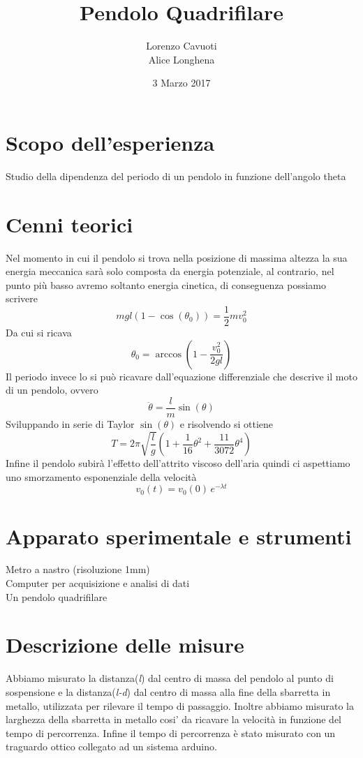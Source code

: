 \documentclass{article}
\title{Pendolo Quadrifilare}
\date{3 Marzo 2017}
\author{Lorenzo Cavuoti\\Alice Longhena}
\begin{document}
	\maketitle
	\section{Scopo dell'esperienza}
		Studio della dipendenza del periodo di un pendolo in funzione dell'angolo theta
	\section{Cenni teorici}
		Nel momento in cui il pendolo si trova nella posizione di massima altezza la sua energia meccanica sar\`{a} solo composta da energia potenziale, al contrario, nel punto pi\`{u} basso avremo soltanto energia cinetica, di conseguenza possiamo scrivere
		\begin{equation}
			mgl(1-\cos(\theta_0)) = \frac{1}{2}mv_0^2
		\end{equation}
		Da cui si ricava
		\begin{equation}
			\theta_0 = \arccos(1-\frac{v_0^2}{2gl})
		\end{equation}
		Il periodo invece lo si pu\`{o} ricavare dall'equazione differenziale che descrive il moto di un pendolo, ovvero
		\begin{equation}
			\ddot{\theta} = \frac{l}{m}\sin(\theta)
		\end{equation}
		Sviluppando in serie di Taylor $\sin(\theta)$ e risolvendo si ottiene
		\begin{equation}
			T = 2\pi \sqrt{\frac{l}{g}}(1+\frac{1}{16}\theta^2+\frac{11}{3072}\theta^4)
			\label{eq periodo}
		\end{equation}
		Infine il pendolo subir\`{a} l'effetto dell'attrito viscoso dell'aria quindi ci aspettiamo uno smorzamento esponenziale della velocit\`{a}
		\begin{equation}
			v_0(t) = v_0(0)\,e^{-\lambda t}
			\label{eq smorzamento}
		\end{equation}
	
	\section{Apparato sperimentale e strumenti}
		Metro a nastro (risoluzione 1mm)\\
		Computer per acquisizione e analisi di dati\\
		Un pendolo quadrifilare
	
	\section{Descrizione delle misure}
		Abbiamo misurato la distanza(\textit{l}) dal centro di massa del pendolo al punto di sospensione e la distanza(\textit{l-d}) dal centro di massa alla fine della sbarretta in metallo, utilizzata per rilevare il tempo di passaggio. Inoltre abbiamo misurato la larghezza della sbarretta in metallo cosi' da ricavare la velocit\`{a} in funzione del tempo di percorrenza. Infine il tempo di percorrenza \`{e} stato misurato con un traguardo ottico collegato ad un sistema arduino.
	
\end{document}
